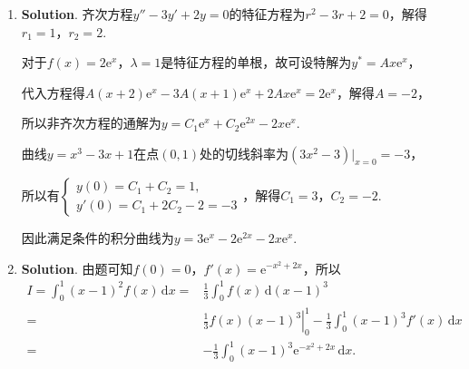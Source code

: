\documentclass[../Main.tex]{subfiles}
\begin{document}
\begin{enumerate}
          当$x=0$时，$y=1$. 代入上式得$\mathrm{d}x+\frac{1}{\sqrt{3}}\sqrt{3}\,\mathrm{d}
              y=0$，所以$\left.\frac{\mathrm{d}y}{\mathrm{d}x}\right|_{x=0}=-1$.

    \item \textbf{Solution}. 齐次方程$y''-3y'+2y=0$的特征方程为$r^{2}-3r+2=0$，解得$r
                  _{1}=1$，$r_{2}=2$.

          对于$f(x)=2\mathrm{e}^{x}$，$\lambda=1$是特征方程的单根，故可设特解为$y^{*}
              =Ax\mathrm{e}^{x}$，

          代入方程得$A(x+2)\mathrm{e}^{x}-3A(x+1)\mathrm{e}^{x}+2Ax\mathrm{e}^{x}=2\mathrm{e}
              ^{x}$，解得$A=-2$，

          所以非齐次方程的通解为$y=C_{1}\mathrm{e}^{x}+C_{2}\mathrm{e}^{2x}-2x\mathrm{e}
              ^{x}$.

          曲线$y=x^{3}-3x+1$在点$(0,1)$处的切线斜率为$(3x^{2}-3)\bigg|_{x=0}=-3$，

          所以有$\begin{cases}
                  y(0)=C_{1}+C_{2}=1, \\
                  y'(0)=C_{1}+2C_{2}-2=-3
              \end{cases}$，解得$C_{1}=3$，$C_{2}=-2$.

          因此满足条件的积分曲线为$y=3\mathrm{e}^{x}-2\mathrm{e}^{2x}-2x\mathrm{e}^{x}$.

    \item \textbf{Solution}. 由题可知$f(0)=0$，$f'(x)=\mathrm{e}^{-x^2+2x}$，所以
          \[
              \begin{aligned}
                  I = \int_{0}^{1}(x-1)^{2} f(x)\,\mathrm{d}x = & \frac{1}{3}\int_{0}^{1}f(x)\,\mathrm{d}(x-1)^{3}                                                  \\
                  =                                             & \left.\frac{1}{3}f(x)(x-1)^{3}\right|_{0}^{1}-\frac{1}{3}\int_{0}^{1}(x-1)^{3} f'(x)\,\mathrm{d}x \\
                  =                                             & -\frac{1}{3}\int_{0}^{1}(x-1)^{3} \mathrm{e}^{-x^2+2x}\,\mathrm{d}x.
              \end{aligned}
          \]


\end{enumerate}
\end{document}
